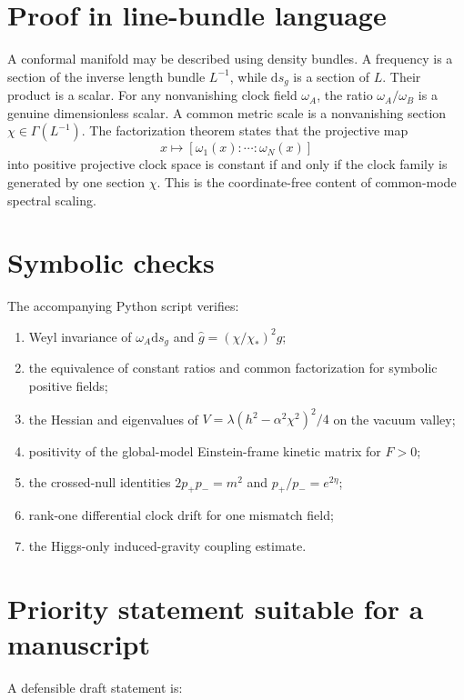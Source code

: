 \documentclass[11pt,a4paper]{article}
\newcommand{\dd}{\mathrm{d}}
\begin{document}
\appendix

\section{Proof in line-bundle language}

A conformal manifold may be described using density bundles. A frequency is a section of the inverse length bundle $L^{-1}$, while $\dd s_g$ is a section of $L$. Their product is a scalar. For any nonvanishing clock field $\omega_A$, the ratio $\omega_A/\omega_B$ is a genuine dimensionless scalar. A common metric scale is a nonvanishing section $\chi\in\Gamma(L^{-1})$. The factorization theorem states that the projective map
\[
 x\longmapsto [\omega_1(x):\cdots:\omega_N(x)]
\]
into positive projective clock space is constant if and only if the clock family is generated by one section $\chi$. This is the coordinate-free content of common-mode spectral scaling.

\section{Symbolic checks}

The accompanying Python script verifies:

\begin{enumerate}
  \item Weyl invariance of $\omega_A\dd s_g$ and $\widehat g=(\chi/\chi_*)^2g$;
  \item the equivalence of constant ratios and common factorization for symbolic positive fields;
  \item the Hessian and eigenvalues of $V=\lambda(h^2-\alpha^2\chi^2)^2/4$ on the vacuum valley;
  \item positivity of the global-model Einstein-frame kinetic matrix for $F>0$;
  \item the crossed-null identities $2p_+p_-=m^2$ and $p_+/p_-=e^{2\eta}$;
  \item rank-one differential clock drift for one mismatch field;
  \item the Higgs-only induced-gravity coupling estimate.
\end{enumerate}

\section{Priority statement suitable for a manuscript}

A defensible draft statement is:
\end{document}

